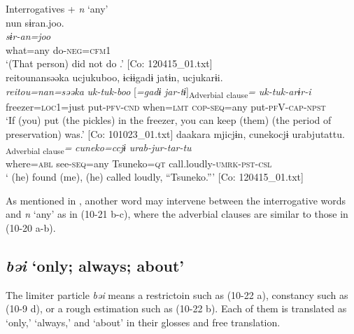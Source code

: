 \ea\label{ex:10.21}   Interrogatives + \textit{n} ‘any’\\
  \ea  %
      \glll    nun  sɨran.joo.\\
      \textit{}  \textit{sɨr-an=joo}\\
      what=any  do-\textsc{neg}=\textsc{cfm}1\\
      \glt       ‘(That person) did not do .’ [Co: 120415\_01.txt]
  \ex\relax [= (8-44 a)]\\
      \glll    {\textbar}reitou{\textbar}nansəəka  ucjukuboo,  ɨcɨɨgadɨ  jatɨn,  ucjukarɨi.\\
      \textit{reitou=nan=səəka}  \textit{uk-tuk-boo}  [\textit{=gadɨ}  \textit{jar-tɨ}]\textsubscript{Adverbial} \textsubscript{clause}\textit{=} \textit{uk-tuk-arɨr-i}\\
      freezer=\textsc{loc}1=just  put-\textsc{pfv}-\textsc{cnd}  when=\textsc{lmt}  \textsc{cop}-\textsc{seq}=any  put-\textsc{pf}V-\textsc{cap}-\textsc{npst}\\
      \glt       ‘If (you) put (the pickles) in the freezer, you can keep (them)  (the period of preservation) was.’ [Co: 101023\_01.txt]
  \ex  %
      \glll    daakara  mjicjɨn,  cunekocjɨ  urabjutattu.\\
      [\textit{\Highlight{daa}=kara}  \textit{mj-tɨ}]\textsubscript{Adverbial clause}\textit{=}  \textit{cuneko=ccjɨ}  \textit{urab-jur-tar-tu}\\
      where=\textsc{abl}  see-\textsc{seq}=any  Tsuneko=\textsc{qt}  call.loudly-\textsc{umrk}-\textsc{pst}-\textsc{csl}\\
      \glt       ‘ (he) found (me), (he) called loudly, “Tsuneko.”’ [Co: 120415\_01.txt]
    \z
\z

As mentioned in , another word may intervene between the interrogative words and \textit{n} ‘any’ as in (10-21 b-c), where the adverbial clauses are similar to those in (10-20 a-b).

\subsection{\textit{bəi} ‘only; always; about’}\label{sec:10.1.4}

The limiter particle \textit{bəi} means a restrictoin such as (10-22 a), constancy such as (10-9 d), or a rough estimation such as (10-22 b). Each of them is translated as ‘only,’ ‘always,’ and ‘about’ in their glosses and free translation.

